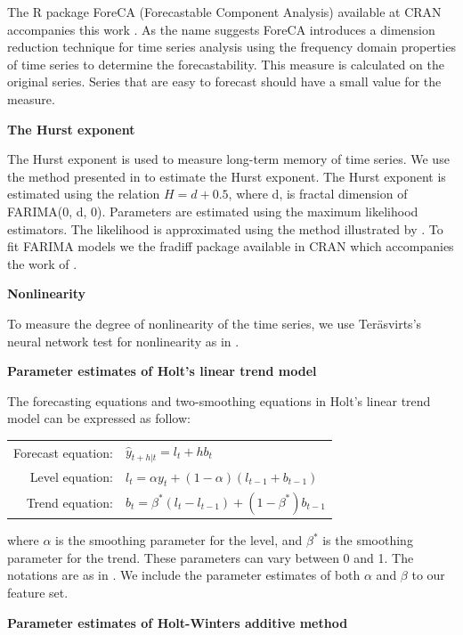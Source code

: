 \documentclass[11pt,a4paper,]{article}
\theoremstyle{definition}
\theoremstyle{definition}
\theoremstyle{definition}
\theoremstyle{remark}
\begin{document}
The R package ForeCA (Forecastable Component Analysis) available at CRAN
accompanies this work \autocite{Foreca}. As the name suggests ForeCA
introduces a dimension reduction technique for time series analysis
using the frequency domain properties of time series to determine the
forecastability. This measure is calculated on the original series.
Series that are easy to forecast should have a small value for the
measure.

\textbf{The Hurst exponent}

The Hurst exponent is used to measure long-term memory of time series.
We use the method presented in \textcite{wang2009rule} to estimate the
Hurst exponent. The Hurst exponent is estimated using the relation
\(H=d+0.5\), where d, is fractal dimension of FARIMA(0, d, 0).
Parameters are estimated using the maximum likelihood estimators. The
likelihood is approximated using the method illustrated by
\textcite{haslett1989space}. To fit FARIMA models we the fradiff package
available in CRAN \autocite{fracdiff} which accompanies the work of
\textcite{haslett1989space}.

\textbf{Nonlinearity}

To measure the degree of nonlinearity of the time series, we use
Teräsvirts's neural network test for nonlinearity as in
\textcite{wang2009rule}.

\textbf{Parameter estimates of Holt's linear trend model}

The forecasting equations and two-smoothing equations in Holt's linear
trend model can be expressed as follow:

\begin{table}[!h]
\centering
\begin{tabular}{rl}
Forecast equation: &  $\hat{y}_{t+h|t}=l_t + hb_t$ \\
 Level equation: & $l_t = \alpha y_t + (1-\alpha)(l_{t-1}+b_{t-1})$ \\
Trend equation: &  $b_t=\beta^*(l_t-l_{t-1})+(1-\beta^*)b_{t-1}$
\end{tabular}
\end{table}

where \(\alpha\) is the smoothing parameter for the level, and
\(\beta^*\) is the smoothing parameter for the trend. These parameters
can vary between 0 and 1. The notations are as in
\textcite{hyndman2014forecasting}. We include the parameter estimates of
both \(\alpha\) and \(\beta\) to our feature set.

\textbf{Parameter estimates of Holt-Winters additive method}
\end{document}

